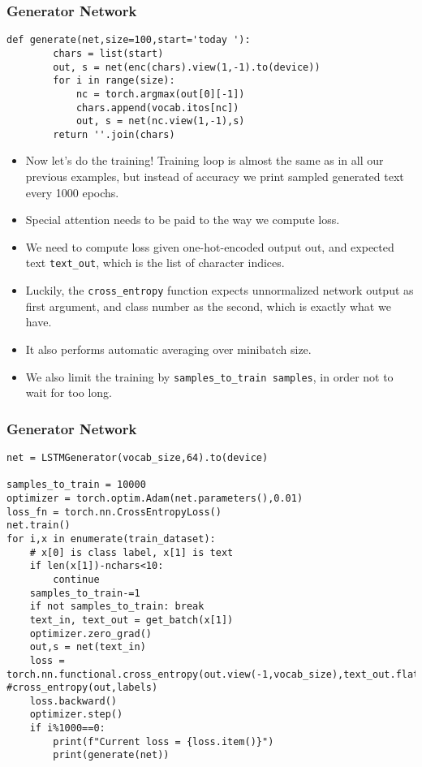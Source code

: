 \begin{frame}[fragile] \frametitle{Generator Network}
\begin{lstlisting}
def generate(net,size=100,start='today '):
        chars = list(start)
        out, s = net(enc(chars).view(1,-1).to(device))
        for i in range(size):
            nc = torch.argmax(out[0][-1])
            chars.append(vocab.itos[nc])
            out, s = net(nc.view(1,-1),s)
        return ''.join(chars)
\end{lstlisting}

\begin{itemize}
\item Now let's do the training! Training loop is almost the same as in all our previous examples, but instead of accuracy we print sampled generated text every 1000 epochs.
\item Special attention needs to be paid to the way we compute loss. 
\item We need to compute loss given one-hot-encoded output out, and expected text \lstinline|text_out|, which is the list of character indices. 
\item Luckily, the \lstinline|cross_entropy| function expects unnormalized network output as first argument, and class number as the second, which is exactly what we have. 
\item It also performs automatic averaging over minibatch size.
\item We also limit the training by \lstinline|samples_to_train samples|, in order not to wait for too long.
\end{itemize}


\end{frame}

\begin{frame}[fragile] \frametitle{Generator Network}
\begin{lstlisting}
net = LSTMGenerator(vocab_size,64).to(device)

samples_to_train = 10000
optimizer = torch.optim.Adam(net.parameters(),0.01)
loss_fn = torch.nn.CrossEntropyLoss()
net.train()
for i,x in enumerate(train_dataset):
    # x[0] is class label, x[1] is text
    if len(x[1])-nchars<10:
        continue
    samples_to_train-=1
    if not samples_to_train: break
    text_in, text_out = get_batch(x[1])
    optimizer.zero_grad()
    out,s = net(text_in)
    loss = torch.nn.functional.cross_entropy(out.view(-1,vocab_size),text_out.flatten()) #cross_entropy(out,labels)
    loss.backward()
    optimizer.step()
    if i%1000==0:
        print(f"Current loss = {loss.item()}")
        print(generate(net))
\end{lstlisting}

\end{frame}

